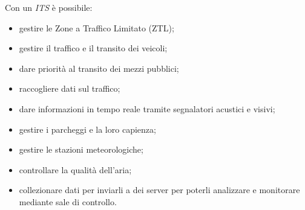 Con un \emph{ITS} è possibile:
\begin{itemize}
    \item gestire le Zone a Traffico Limitato (ZTL);
    \item gestire il traffico e il transito dei veicoli;
    \item dare priorità al transito dei mezzi pubblici;
    \item raccogliere dati sul traffico;
    \item dare informazioni in tempo reale tramite segnalatori acustici e visivi;
    \item gestire i parcheggi e la loro capienza;
    \item gestire le stazioni meteorologiche;
    \item controllare la qualità dell'aria;
    \item collezionare dati per inviarli a dei server per poterli analizzare e monitorare mediante sale di controllo.
\end{itemize}
